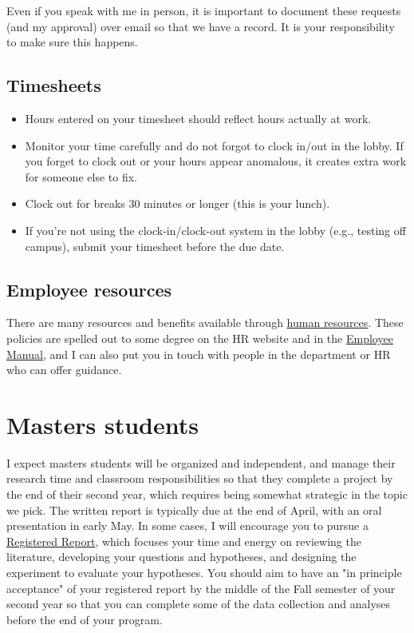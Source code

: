 \documentclass[letterpaper,12pt,oneside]{memoir}
\begin{document}
\begin{shaded}
\noindent Even if you speak with me in person, it is important to document these requests (and my approval) over email so that we have a record. It is your responsibility to make sure this happens.
\end{shaded}

\subsection{Timesheets}

\begin{itemize}
\item Hours entered on your timesheet should reflect hours actually at work.
\item Monitor your time carefully and do not forgot to clock in/out in the lobby. If you forget to clock out or your hours appear anomalous, it creates extra work for someone else to fix. 
\item Clock out for breaks 30 minutes or longer (this is your lunch).
\item If you're not using the clock-in/clock-out system in the lobby (e.g., testing off campus), submit your timesheet before the due date.
\end{itemize}


\subsection{Employee resources}

There are many resources and benefits available through \href{https://www.temple.edu/faculty-and-staff/working-temple/human-resources}{human resources}. These policies are spelled out to some degree on the HR website and in the \href{http://www.temple.edu/hr/departments/employeerelations/documents/Employee_Manual_Feb_2016.pdf}{Employee Manual}, and I can also put you in touch with people in the department or HR who can offer guidance.

\section{Masters students}
I expect masters students will be organized and independent, and manage their research time and classroom responsibilities so that they complete a project by the end of their second year, which requires being somewhat strategic in the topic we pick. The written report is typically due at the end of April, with an oral presentation in early May. In some cases, I will encourage you to pursue a \href{https://cos.io/rr/}{Registered Report}, which focuses your time and energy on reviewing the literature, developing your questions and hypotheses, and designing the experiment to evaluate your hypotheses. You should aim to have an "in principle acceptance" of your registered report by the middle of the Fall semester of your second year so that you can complete some of the data collection and analyses before the end of your program.
\end{document}
